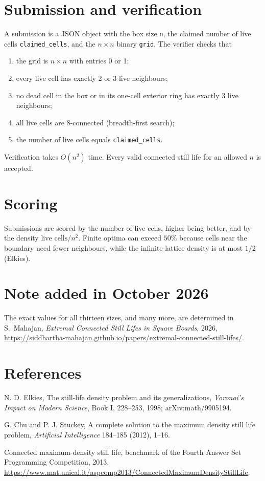 \documentclass[11pt]{article}
\begin{document}
\section*{Submission and verification}
A submission is a JSON object with the box size \texttt{n}, the claimed number of
live cells \texttt{claimed\_cells}, and the $n\times n$ binary \texttt{grid}.  The
verifier checks that
\begin{enumerate}
\item the grid is $n\times n$ with entries 0 or 1;
\item every live cell has exactly 2 or 3 live neighbours;
\item no dead cell in the box or in its one-cell exterior ring has exactly 3 live
neighbours;
\item all live cells are 8-connected (breadth-first search);
\item the number of live cells equals \texttt{claimed\_cells}.
\end{enumerate}
Verification takes $O(n^2)$ time.  Every valid connected still life for an
allowed $n$ is accepted.

\section*{Scoring}
Submissions are scored by the number of live cells, higher being better, and by
the density $\text{live cells}/n^2$.  Finite optima can exceed $50\%$ because
cells near the boundary need fewer neighbours, while the infinite-lattice
density is at most $1/2$ (Elkies).

\section*{Note added in October 2026}
The exact values for all thirteen sizes, and many more, are determined in
S.~Mahajan, \emph{Extremal Connected Still Lifes in Square Boards}, 2026,
\url{https://siddhartha-mahajan.github.io/papers/extremal-connected-still-lifes/}.

\section*{References}
\begin{enumerate}[label={[\arabic*]}]
\item N. D. Elkies, The still-life density problem and its generalizations,
\emph{Voronoi's Impact on Modern Science}, Book I, 228--253, 1998;
arXiv:math/9905194.
\item G. Chu and P. J. Stuckey, A complete solution to the maximum density still
life problem, \emph{Artificial Intelligence} 184--185 (2012), 1--16.
\item Connected maximum-density still life, benchmark of the Fourth Answer Set
Programming Competition, 2013,
\url{https://www.mat.unical.it/aspcomp2013/ConnectedMaximumDensityStillLife}.
\end{enumerate}
\end{document}
